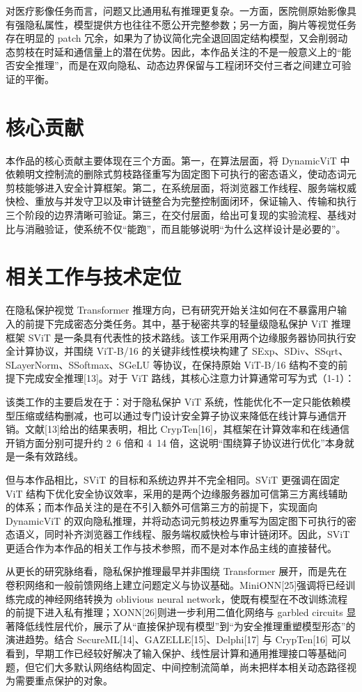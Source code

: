 对医疗影像任务而言，问题又比通用私有推理更复杂。一方面，医院侧原始影像具有强隐私属性，模型提供方也往往不愿公开完整参数；另一方面，胸片等视觉任务存在明显的 patch 冗余，如果为了协议简化完全退回固定结构模型，又会削弱动态剪枝在时延和通信量上的潜在优势。因此，本作品关注的不是一般意义上的“能否安全推理”，而是在双向隐私、动态边界保留与工程闭环交付三者之间建立可验证的平衡。

\section{核心贡献}

本作品的核心贡献主要体现在三个方面。第一，在算法层面，将 DynamicViT 中依赖明文控制流的删除式剪枝路径重写为固定图下可执行的密态语义，使动态词元剪枝能够进入安全计算框架。第二，在系统层面，将浏览器工作线程、服务端权威快检、重放与并发守卫以及审计链整合为完整控制面闭环，保证输入、传输和执行三个阶段的边界清晰可验证。第三，在交付层面，给出可复现的实验流程、基线对比与消融验证，使系统不仅“能跑”，而且能够说明“为什么这样设计是必要的”。

\section{相关工作与技术定位}

在隐私保护视觉 Transformer 推理方向，已有研究开始关注如何在不暴露用户输入的前提下完成密态分类任务。其中，基于秘密共享的轻量级隐私保护 ViT 推理框架 SViT 是一条具有代表性的技术路线。该工作采用两个边缘服务器协同执行安全计算协议，并围绕 ViT-B/16 的关键非线性模块构建了 SExp、SDiv、SSqrt、SLayerNorm、SSoftmax、SGeLU 等协议，在保持原始 ViT-B/16 结构不变的前提下完成安全推理[13]。对于 ViT 路线，其核心注意力计算通常可写为式（1-1）：

该类工作的主要启发在于：对于隐私保护 ViT 系统，性能优化不一定只能依赖模型压缩或结构删减，也可以通过专门设计安全算子协议来降低在线计算与通信开销。文献[13]给出的结果表明，相比 CrypTen[16]，其框架在计算效率和在线通信开销方面分别可提升约 2~6 倍和 4~14 倍，这说明“围绕算子协议进行优化”本身就是一条有效路线。

但与本作品相比，SViT 的目标和系统边界并不完全相同。SViT 更强调在固定 ViT 结构下优化安全协议效率，采用的是两个边缘服务器加可信第三方离线辅助的体系；而本作品关注的是在不引入额外可信第三方的前提下，实现面向 DynamicViT 的双向隐私推理，并将动态词元剪枝边界重写为固定图下可执行的密态语义，同时补齐浏览器工作线程、服务端权威快检与审计链闭环。因此，SViT 更适合作为本作品的相关工作与技术参照，而不是对本作品主线的直接替代。

从更长的研究脉络看，隐私保护推理最早并非围绕 Transformer 展开，而是先在卷积网络和一般前馈网络上建立问题定义与协议基础。MiniONN[25]强调将已经训练完成的神经网络转换为 oblivious neural network，使既有模型在不改训练流程的前提下进入私有推理；XONN[26]则进一步利用二值化网络与 garbled circuits 显著降低线性层代价，展示了从“直接保护现有模型”到“为安全推理重塑模型形态”的演进趋势。结合 SecureML[14]、GAZELLE[15]、Delphi[17] 与 CrypTen[16] 可以看到，早期工作已经较好解决了输入保护、线性层计算和通用推理接口等基础问题，但它们大多默认网络结构固定、中间控制流简单，尚未把样本相关动态路径视为需要重点保护的对象。

